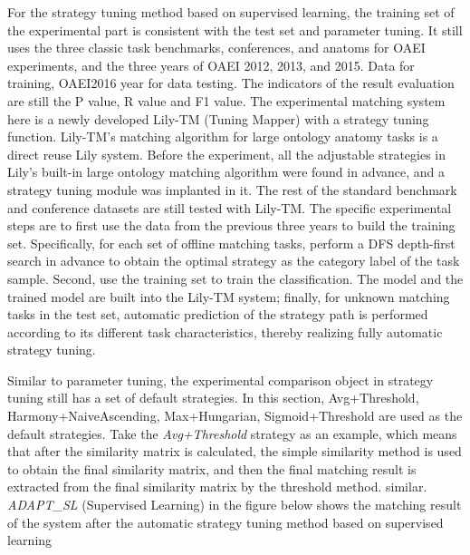 \documentclass[twoside]{article}
\makeatletter
\def\subsubsection{\@startsection{subsubsection}{3}{\z@}%
 {-2.2ex\@plus -.21ex \@minus -.2ex}%
 {1.4ex \@plus.2ex}
{\normalfont\normalsize\protect\baselineskip=12pt plus.2pt minus.2pt\sl}}
\makeatother
\begin{document}
For the strategy tuning method based on supervised learning, the training set of the experimental part is consistent with the test set and parameter tuning. It still uses the three classic task benchmarks, conferences, and anatoms for OAEI experiments, and the three years of OAEI 2012, 2013, and 2015. Data for training, OAEI2016 year for data testing.
The indicators of the result evaluation are still the P value, R value and F1 value.
The experimental matching system here is a newly developed Lily-TM (Tuning Mapper) with a strategy tuning function.
Lily-TM's matching algorithm for large ontology anatomy tasks is a direct reuse Lily system. Before the experiment, all the adjustable strategies in Lily's built-in large ontology matching algorithm were found in advance, and a strategy tuning module was implanted in it.
The rest of the standard benchmark and conference datasets are still tested with Lily-TM.
The specific experimental steps are to first use the data from the previous three years to build the training set. Specifically, for each set of offline matching tasks, perform a DFS depth-first search in advance to obtain the optimal strategy as the category label of the task sample. Second, use the training set to train the classification. The model and the trained model are built into the Lily-TM system; finally, for unknown matching tasks in the test set, automatic prediction of the strategy path is performed according to its different task characteristics, thereby realizing fully automatic strategy tuning.


Similar to parameter tuning, the experimental comparison object in strategy tuning still has a set of default strategies. In this section, Avg+Threshold, Harmony+NaiveAscending, Max+Hungarian, Sigmoid+Threshold are used as the default strategies.
Take the {\it Avg+Threshold} strategy as an example, which means that after the similarity matrix is calculated, the simple similarity method is used to obtain the final similarity matrix, and then the final matching result is extracted from the final similarity matrix by the threshold method. similar.
{\it ADAPT\_SL} (Supervised Learning) in the figure below shows the matching result of the system after the automatic strategy tuning method based on supervised learning
\end{document}
